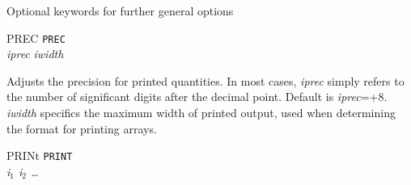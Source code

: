 Optional keywords for further general options
\begin{keywordlist}
\item[PREC]
{\tt PREC}\\
{\em iprec} {\em iwidth}

Adjusts the precision for printed quantities. In most cases, {\em iprec}\/ simply refers
to the number of significant digits after the decimal point. Default is {\em iprec}=+8.
{\em iwidth}\/ specifics the maximum width of printed output, used when determining
the format for printing arrays.
\item[PRINt]
{\tt PRINT}\\
{\em i$_1$ i$_2$ \ldots}


\end{keywordlist}
